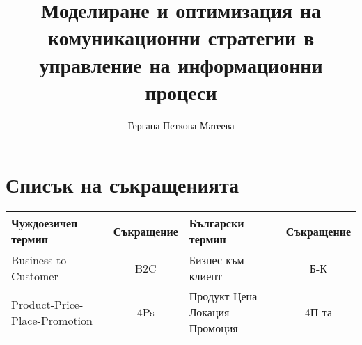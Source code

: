 \documentclass[14pt,a4paper,openany]{book}
\title{Моделиране и оптимизация на комуникационни стратегии в управление на информационни процеси}
\author{Гергана Петкова Матеева}
\begin{document}



\thispagestyle{empty}

\setcounter{page}{1}

\tableofcontents

\chapter*{Списък на съкращенията}

\begin{longtable}{ | p{3.75cm} | c | p{3.75cm} | c | }
\hline
\cellcolor{gray!15}Чуждоезичен термин & \cellcolor{gray!15}Съкращение & \cellcolor{gray!15}Български термин & \cellcolor{gray!15}Съкращение \\ [0.05ex] 
\hline
Business to Customer & B2C & Бизнес към клиент & Б-К \\
\hline
Product-Price-Place-Promotion & 4Ps & Продукт-Цена-Локация-Промоция & 4П-та \\
\hline
\end{longtable}

\listoffigures

\listoftables

\lstlistoflistings

\newpage

\setcounter{page}{1}












\printindex



%
\end{document}
